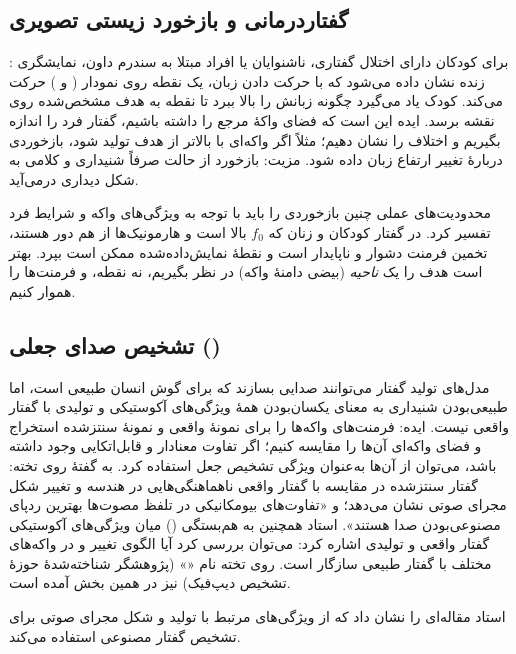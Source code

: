 \subsection{گفتاردرمانی و بازخورد زیستی تصویری}
: برای کودکان دارای اختلال گفتاری، ناشنوایان یا افراد مبتلا به سندرم داون، نمایشگری زنده نشان داده می‌شود که با حرکت دادن زبان، یک نقطه روی نمودار ( و ) حرکت می‌کند. کودک یاد می‌گیرد چگونه زبانش را بالا ببرد تا نقطه به هدف مشخص‌شده روی نقشه برسد. ایده این است که فضای واکهٔ مرجع را داشته باشیم، گفتار فرد را اندازه بگیریم و اختلاف را نشان دهیم؛ مثلاً اگر واکه‌ای با  بالاتر از هدف تولید شود، بازخوردی دربارهٔ تغییر ارتفاع زبان داده شود. مزیت: بازخورد از حالت صرفاً شنیداری و کلامی به شکل دیداری درمی‌آید.

\begin{warningbox}{محدودیت‌های عملی}
چنین بازخوردی را باید با توجه به ویژگی‌های واکه و شرایط فرد تفسیر کرد. در گفتار کودکان و زنان که $f_0$ بالا است و هارمونیک‌ها از هم دور هستند، تخمین فرمنت دشوار و ناپایدار است و نقطهٔ نمایش‌داده‌شده ممکن است بپرد. بهتر است هدف را یک \emph{ناحیه} (بیضی دامنهٔ واکه) در نظر بگیریم، نه نقطه، و فرمنت‌ها را هموار کنیم.
\end{warningbox}

\subsection{تشخیص صدای جعلی ()}
مدل‌های تولید گفتار می‌توانند صدایی بسازند که برای گوش انسان طبیعی است، اما طبیعی‌بودن شنیداری به معنای یکسان‌بودن همهٔ ویژگی‌های آکوستیکی و تولیدی با گفتار واقعی نیست. ایده: فرمنت‌های واکه‌ها را برای نمونهٔ واقعی و نمونهٔ سنتز‌شده استخراج و فضای واکه‌ای آن‌ها را مقایسه کنیم؛ اگر تفاوت معنادار و قابل‌اتکایی وجود داشته باشد، می‌توان از آن‌ها به‌عنوان ویژگی تشخیص جعل استفاده کرد. به گفتهٔ روی تخته: گفتار سنتز‌شده در مقایسه با گفتار واقعی ناهماهنگی‌هایی در هندسه و تغییر شکل مجرای صوتی نشان می‌دهد؛ و «تفاوت‌های بیومکانیکی در تلفظ مصوت‌ها بهترین ردپای مصنوعی‌بودن صدا هستند». استاد همچنین به هم‌بستگی () میان ویژگی‌های آکوستیکی گفتار واقعی و تولیدی اشاره کرد: می‌توان بررسی کرد آیا الگوی تغییر  و  در واکه‌های مختلف با گفتار طبیعی سازگار است. روی تخته نام «» (پژوهشگر شناخته‌شدهٔ حوزهٔ تشخیص دیپ‌فیک) نیز در همین بخش آمده است.

استاد مقاله‌ای را نشان داد که از ویژگی‌های مرتبط با تولید و شکل مجرای صوتی برای تشخیص گفتار مصنوعی استفاده می‌کند.

